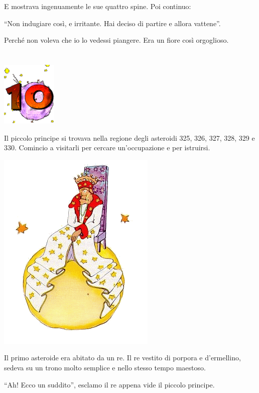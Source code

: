 \documentclass[11pt]{scrbook}
\begin{document}
E mostrava ingenuamente le sue quattro spine. Poi continuo:

``Non indugiare così, e irritante. Hai deciso di partire e allora
vattene''.

Perché non voleva che io lo vedessi piangere. Era un fiore così
orgoglioso.

\chapter{}
\begin{center}
\includegraphics{./img/chapter10.png}
\end{center}

Il piccolo principe si trovava nella regione degli asteroidi 325, 326,
327, 328, 329 e 330. Comincio a visitarli per cercare un'occupazione e
per istruirsi.

\begin{center}
\includegraphics{./img/10a.png}
\end{center}

Il primo asteroide era abitato da un re. Il re vestito di porpora e
d'ermellino, sedeva su un trono molto semplice e nello stesso tempo
maestoso.

``Ah! Ecco un suddito'', esclamo il re appena vide il piccolo principe.
\end{document}
